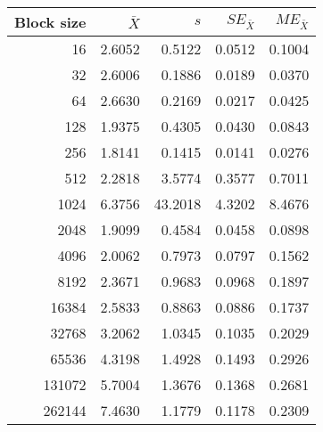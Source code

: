 \begin{tabular}{rrrrr}\toprule
{\small Block size} & $\bar{X}$ & $s$ & $SE_{\bar{X}}$ & $ME_{\bar{X}}$ \\\midrule
16 & 2.6052 & 0.5122 & 0.0512 & 0.1004\\
32 & 2.6006 & 0.1886 & 0.0189 & 0.0370\\
64 & 2.6630 & 0.2169 & 0.0217 & 0.0425\\
128 & 1.9375 & 0.4305 & 0.0430 & 0.0843\\
256 & 1.8141 & 0.1415 & 0.0141 & 0.0276\\
512 & 2.2818 & 3.5774 & 0.3577 & 0.7011\\
1024 & 6.3756 & 43.2018 & 4.3202 & 8.4676\\
2048 & 1.9099 & 0.4584 & 0.0458 & 0.0898\\
4096 & 2.0062 & 0.7973 & 0.0797 & 0.1562\\
8192 & 2.3671 & 0.9683 & 0.0968 & 0.1897\\
16384 & 2.5833 & 0.8863 & 0.0886 & 0.1737\\
32768 & 3.2062 & 1.0345 & 0.1035 & 0.2029\\
65536 & 4.3198 & 1.4928 & 0.1493 & 0.2926\\
131072 & 5.7004 & 1.3676 & 0.1368 & 0.2681\\
262144 & 7.4630 & 1.1779 & 0.1178 & 0.2309\\
\bottomrule
\end{tabular}

